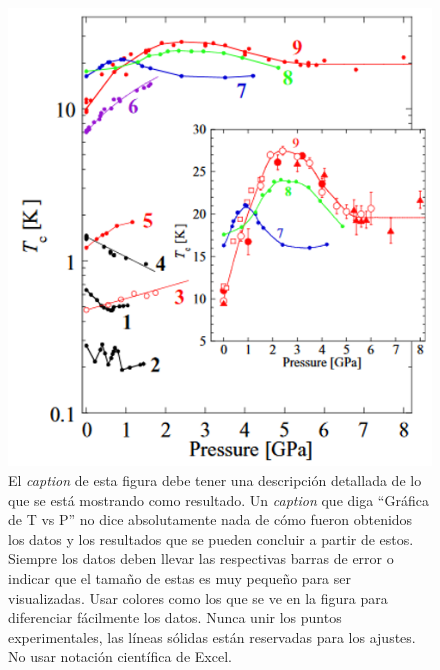 \documentclass[a4paper, amsfonts, amssymb, amsmath, reprint, showkeys, nofootinbib, twoside]{revtex4-1}
\begin{document}
\begin{itemize}
    \begin{figure}[h]
    \centering
    \includegraphics[scale=0.5]{GraphEj.png}
    \caption{El \emph{caption} de esta figura debe tener una descripción detallada de lo que se está mostrando como resultado. Un \emph{caption} que diga ``Gráfica de T vs P'' no dice absolutamente nada de cómo fueron obtenidos los datos y los resultados que se pueden concluir a partir de estos. Siempre los datos deben llevar las respectivas barras de error o indicar que el tamaño de estas es muy pequeño para ser visualizadas. Usar colores como los que se ve en la figura para diferenciar fácilmente los datos. Nunca unir los puntos experimentales, las líneas sólidas están reservadas para los ajustes. No usar notación científica de Excel.}
    \label{fig:my_label}
    \end{figure}


\end{itemize}
\end{document}
